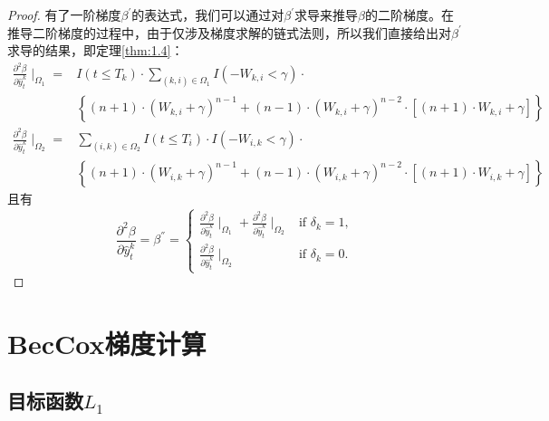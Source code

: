 \begin{proof}
有了一阶梯度$\beta^{'}$的表达式，我们可以通过对$\beta^{'}$求导来推导$\beta$的二阶梯度。在推导二阶梯度的过程中，由于仅涉及梯度求解的链式法则，所以我们直接给出对$\beta^{'}$求导的结果，即定理\ref{thm:1.4}：\[
\begin{split}
\frac{\partial^2 \beta}{\partial \hat{y}_t^k} \mid_{\Omega_1} =& I(t\le T_k)\cdot \sum\limits_{(k,i)\in \Omega_1} I(-W_{k,i}<\gamma)\cdot \\
  & \left\{(n+1)\cdot (W_{k,i}+\gamma)^{n-1} + (n-1)\cdot (W_{k,i}+\gamma)^{n-2}\cdot [(n+1)\cdot W_{k,i}+\gamma]\right\} \\
\frac{\partial^2 \beta}{\partial \hat{y}_t^k} \mid_{\Omega_2} =& \sum\limits_{(i,k)\in \Omega_2} I(t\le T_i)\cdot I(-W_{i,k}<\gamma)\cdot \\
  & \left\{(n+1)\cdot (W_{i,k}+\gamma)^{n-1} + (n-1)\cdot (W_{i,k}+\gamma)^{n-2}\cdot [(n+1)\cdot W_{i,k}+\gamma]\right\}
\end{split}
\] 且有$$
\frac{\partial^2 \beta}{\partial \hat{y}_t^k}=\beta^{''}=
\begin{cases}
\frac{\partial^2 \beta}{\partial \hat{y}_t^k} \mid_{\Omega_1} + \frac{\partial^2 \beta}{\partial \hat{y}_t^k} \mid_{\Omega_2} & \text{if } \delta_k = 1,\\
\frac{\partial^2 \beta}{\partial \hat{y}_t^k} \mid_{\Omega_2} & \text{if } \delta_k = 0.
\end{cases}
$$
\end{proof}

\section{BecCox梯度计算}

\subsection{目标函数$L_1$}

